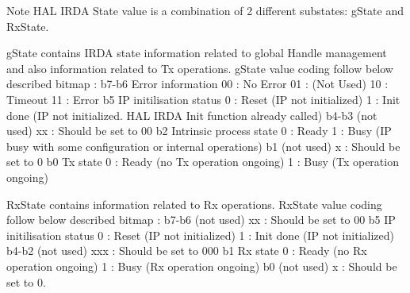 \begin{DoxyNote}{Note}
H\+AL I\+R\+DA State value is a combination of 2 different substates\+: g\+State and Rx\+State.
\begin{DoxyItemize}
\item g\+State contains I\+R\+DA state information related to global Handle management and also information related to Tx operations. g\+State value coding follow below described bitmap \+: b7-\/b6 Error information 00 \+: No Error 01 \+: (Not Used) 10 \+: Timeout 11 \+: Error b5 IP initilisation status 0 \+: Reset (IP not initialized) 1 \+: Init done (IP not initialized. H\+AL I\+R\+DA Init function already called) b4-\/b3 (not used) xx \+: Should be set to 00 b2 Intrinsic process state 0 \+: Ready 1 \+: Busy (IP busy with some configuration or internal operations) b1 (not used) x \+: Should be set to 0 b0 Tx state 0 \+: Ready (no Tx operation ongoing) 1 \+: Busy (Tx operation ongoing)
\item Rx\+State contains information related to Rx operations. Rx\+State value coding follow below described bitmap \+: b7-\/b6 (not used) xx \+: Should be set to 00 b5 IP initilisation status 0 \+: Reset (IP not initialized) 1 \+: Init done (IP not initialized) b4-\/b2 (not used) xxx \+: Should be set to 000 b1 Rx state 0 \+: Ready (no Rx operation ongoing) 1 \+: Busy (Rx operation ongoing) b0 (not used) x \+: Should be set to 0. 
\end{DoxyItemize}
\end{DoxyNote}
